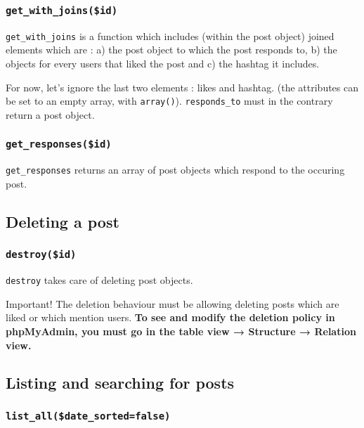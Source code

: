 \documentclass[twoside,a4paper,12pt]{article}
\begin{document}
\subsubsection{\texttt{get\_with\_joins(\$id)}}

\texttt{get\_with\_joins} is a function which includes (within the post object) joined elements which are : a) the post object to which the post responds to, b) the objects for every users that liked the post and c) the hashtag it includes.

For now, let's ignore the last two elements : likes and hashtag. (the attributes can be set to an empty array, with \texttt{array()}). \texttt{responds\_to} must in the contrary return a post object.

\subsubsection{\texttt{get\_responses(\$id)}}

\texttt{get\_responses} returns an array of post objects which respond to the occuring post.

\subsection{Deleting a post}

\subsubsection{\texttt{destroy(\$id)}}

\texttt{destroy} takes care of deleting post objects.

\begin{bclogo}[logo=\bcattention, noborder=true, barre=none]{Important!}
	The deletion behaviour must be allowing deleting posts which are liked or which mention users. \textbf{To see and modify the deletion policy in phpMyAdmin, you must go in the table view → Structure → Relation view.}
		
\end{bclogo}

\subsection{Listing and searching for posts}

\subsubsection{\texttt{list\_all(\$date\_sorted=false)}}
\end{document}

